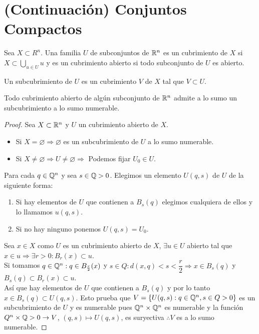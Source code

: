 \section{(Continuación) Conjuntos Compactos}

\begin{definition}[Cubrimiento]
  Sea $X \subset R^n$. Una familia $U$ de subconjuntos de $\mathbb{R}^n$ es un cubrimiento de $X$ si $X \subset \bigcup_{u \in U} u$ y es un cubrimiento abierto si todo subconjunto de $U$ es abierto.
\end{definition}

\begin{definition}[Subcubrimiento]
  Un subcubrimiento de $U$ es un cubrimiento $V$ de $X$ tal que $V \subset U$.
\end{definition}

\begin{theorem}[Lindelöf]
  Todo cubrimiento abierto de algún subconjunto de $\mathbb{R}^n$ admite a lo sumo un subcubrimiento a lo sumo numerable.
  \begin{proof}
    Sea $X \subset \mathbb{R}^n$ y $U$ un cubrimiento abierto de $X$.
    \begin{itemize}
      \item Si $X = \varnothing \Rightarrow \varnothing$ es un subcubrimiento de $U$ a lo
            sumo numerable.
      \item Si $X \neq \varnothing \Rightarrow U \neq \varnothing \Rightarrow$ Podemos
            fijar $U_0 \in U$.
    \end{itemize}
    Para cada $q \in \mathbb{Q}^n$ y sea $s \in \mathbb{Q} > 0$. Elegimos un elemento $U(q, s)$ de $U$ de la siguiente forma:
    \begin{enumerate}
      \item Si hay elementos de $U$ que contienen a $B_s(q)$ elegimos cualquiera de ellos y
            lo llamamos $u(q, s)$.
      \item Si no hay ninguno ponemos $U(q, s) = U_0$.
    \end{enumerate}
    Sea $x \in X$ como $U$ es un cubrimiento abierto de $X$, $\exists u \in U$ abierto tal que $x \in u \Rightarrow \exists r > 0 : B_r(x) \subset u$. \\
    Si tomamos $q \in \mathbb{Q}^n : q \in B_{\frac{r}{2}}(x)$ y $s \in Q : d(x, q) < s < \dfrac{r}{2} \Rightarrow x \in B_s(q)$ y $B_s(q) \subset B_r(x) \subset u$. \\
    Así que hay elementos de $U$ que contienen a $B_s(q)$ y por lo tanto $x \in B_s(q) \subset U(q, s)$. Esto prueba que $V = \{ U(q, s) : q \in \mathbb{Q}^n, s \in Q > 0 \}$ es un subcubrimiento de $U$ y es numerable pues $\mathbb{Q}^n \times \mathbb{Q}^n$ es numerable y la función $Q^n \times \mathbb{Q} > 0 \to V$, $(q, s) \mapsto U(q, s)$, es suryectiva $\therefore V$ es a lo sumo numerable.
  \end{proof}
\end{theorem}

